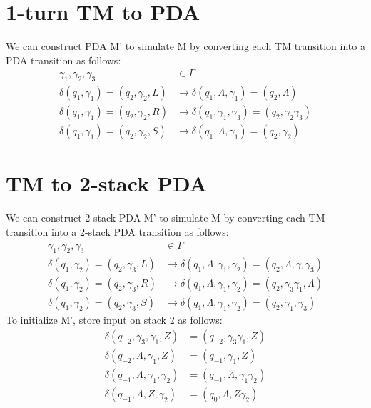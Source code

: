 \documentclass{article}
\begin{document}
\section{1-turn TM to PDA}
We can construct PDA M' to simulate M by converting each TM transition into a
PDA transition as follows:
\begin{align*}
\gamma_1, \gamma_2, \gamma_3 &\in \Gamma\\
\delta(q_1, \gamma_1) = (q_2, \gamma_2, L) &\to
\delta(q_1, \Lambda, \gamma_1) = (q_2, \Lambda)\\
\delta(q_1, \gamma_1) = (q_2, \gamma_2, R) &\to
\delta(q_1, \gamma_1, \gamma_3) = (q_2, \gamma_2 \gamma_3)\\
\delta(q_1, \gamma_1) = (q_2, \gamma_2, S) &\to
\delta(q_1, \Lambda, \gamma_1) = (q_2, \gamma_2)
\end{align*}

\section{TM to 2-stack PDA}
We can construct 2-stack PDA M' to simulate M by converting each TM transition
into a 2-stack PDA transition as follows:
\begin{align*}
\gamma_1, \gamma_2, \gamma_3 &\in \Gamma\\
\delta(q_1, \gamma_2) = (q_2, \gamma_3, L) &\to
\delta(q_1, \Lambda, \gamma_1, \gamma_2) = (q_2, \Lambda, \gamma_1 \gamma_3)\\
\delta(q_1, \gamma_2) = (q_2, \gamma_3, R) &\to
\delta(q_1, \Lambda, \gamma_1, \gamma_2) = (q_2, \gamma_3 \gamma_1, \Lambda)\\
\delta(q_1, \gamma_2) = (q_2, \gamma_3, S) &\to
\delta(q_1, \Lambda, \gamma_1, \gamma_2) = (q_2, \gamma_1, \gamma_3)
\end{align*}
To initialize M', store input on stack 2 as follows:
\begin{align*}
\delta(q_{-2}, \gamma_3, \gamma_1, Z) &= (q_{-2}, \gamma_3 \gamma_1, Z)\\
\delta(q_{-2}, \Lambda, \gamma_1, Z) &= (q_{-1}, \gamma_1, Z)\\
\delta(q_{-1}, \Lambda, \gamma_1, \gamma_2) &= (q_{-1}, \Lambda, \gamma_1 \gamma_2)\\
\delta(q_{-1}, \Lambda, Z, \gamma_2) &= (q_0, \Lambda, Z \gamma_2)
\end{align*}
\end{document}

